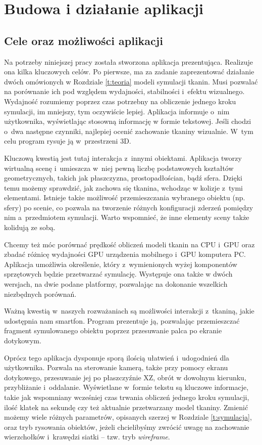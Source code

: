 \chapter{Budowa i działanie aplikacji}
\label{t:praktyka}
	
	\section{Cele oraz możliwości aplikacji}
	\label{t:praktyka:cel}
	
	
	Na potrzeby niniejszej pracy została stworzona aplikacja prezentująca. Realizuje ona kilka kluczowych celów. Po pierwsze, ma  za zadanie zaprezentować działanie dwóch omówionych w Rozdziale \ref{t:teoria} modeli symulacji tkanin. Musi pozwalać na porównanie ich pod względem wydajności, stabilności i~efektu wizualnego. Wydajność rozumiemy poprzez czas potrzebny na obliczenie jednego kroku symulacji, im mniejszy, tym oczywiście lepiej. Aplikacja informuje o~nim użytkownika, wyświetlając stosowną informację w formie tekstowej. Jeśli chodzi o~dwa następne czynniki, najlepiej ocenić zachowanie tkaniny wizualnie. W~tym celu program rysuje ją w~przestrzeni 3D. 
	
	Kluczową kwestią jest tutaj interakcja z~innymi obiektami. Aplikacja tworzy wirtualną scenę i~umieszcza w~niej pewną liczbę podstawowych kształtów geometrycznych, takich jak płaszczyzna, prostopadłościan, bądź sfera. Dzięki temu możemy sprawdzić, jak zachowa się tkanina, wchodząc w kolizje z~tymi elementami. Istnieje także możliwość przemieszczania wybranego obiektu (np. sfery) po scenie, co pozwala na tworzenie różnych konfiguracji zderzeń pomiędzy nim a~przedmiotem symulacji. Warto wspomnieć, że inne elementy sceny także kolidują ze sobą.
	
	Chcemy też móc porównać prędkość obliczeń modeli tkanin na CPU i~GPU oraz zbadać różnicę wydajności GPU urządzenia mobilnego i~GPU komputera PC. Aplikacja umożliwia określenie, który z~wymienionych wyżej komponentów sprzętowych będzie przetwarzać symulację. Występuje ona także w dwóch wersjach, na dwie podane platformy, pozwalając na dokonanie wszelkich niezbędnych porównań.
	
	Ważną kwestią w~naszych rozważaniach są możliwości interakcji z~tkaniną, jakie udostępnia nam smartfon. Program prezentuje ją, pozwalając przemieszczać fragment symulowanego obiektu poprzez przesuwanie palca po ekranie dotykowym.
	
	Oprócz tego aplikacja dysponuje sporą ilością ułatwień i~udogodnień dla użytkownika. Pozwala na sterowanie kamerą, także przy pomocy ekranu dotykowego, przesuwanie jej po płaszczyźnie XZ, obrót w dowolnym kierunku, przybliżanie i~oddalanie. Wyświetlane w~formie tekstu są kluczowe informacje, takie jak wspomniany wcześniej czas trwania obliczeń jednego kroku symulacji, ilość klatek na sekundę czy też aktualnie przetwarzany model tkaniny. Zmienić możemy wiele różnych parametrów, opisanych szerzej w Rozdziale \ref{t:symulacja}, oraz tryb rysowania obiektów, jeżeli chcielibyśmy zwrócić uwagę na zachowanie wierzchołków i~krawędzi siatki -- tzw. tryb \emph{wireframe}.
	
